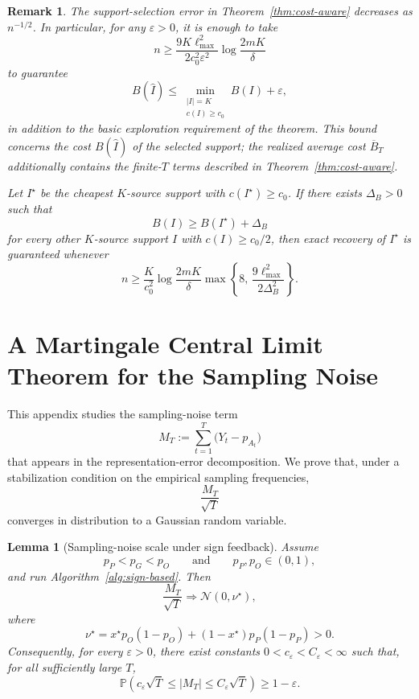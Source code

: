 \documentclass[twoside]{article}
\newtheorem{lemma}{Lemma}
\newtheorem{remark}{Remark}
\begin{document}
\begin{remark}
The support-selection error in Theorem~\ref{thm:cost-aware} decreases as
\(n^{-1/2}\).
In particular, for any \(\varepsilon>0\), it is enough to take
\[
n
\ge
\frac{9K\ell_{\max}^2}{2c_0^2\varepsilon^2}
\log\frac{2mK}{\delta}
\]
to guarantee
\[
B(\widehat I)
\le
\min_{\substack{|I|=K\\ c(I)\ge c_0}}
B(I)
+\varepsilon,
\]
in addition to the basic exploration requirement of the theorem.
This bound concerns the cost \(B(\widehat I)\) of the selected support;
the realized average cost \(\overline B_T\) additionally contains the
finite-\(T\) terms described in Theorem~\ref{thm:cost-aware}.

Let \(I^\star\) be the cheapest \(K\)-source support with
\(c(I^\star)\ge c_0\). If there exists \(\Delta_B>0\) such that
\[
B(I)\ge B(I^\star)+\Delta_B
\]
for every other \(K\)-source support \(I\) with
\(c(I)\ge c_0/2\), then exact recovery of \(I^\star\) is guaranteed whenever
\[
n
\ge
\frac{K}{c_0^2}
\log\frac{2mK}{\delta}
\max\left\{
8,\,
\frac{9\ell_{\max}^2}{2\Delta_B^2}
\right\}.
\]
\end{remark}

\section{A Martingale Central Limit Theorem for the Sampling Noise}
\label{app:martingale-clt}

This appendix studies the sampling-noise term
\[
M_T
:=
\sum_{t=1}^T
\bigl(Y_t-p_{A_t}\bigr)
\]
that appears in the representation-error decomposition. We prove that, under
a stabilization condition on the empirical sampling frequencies,
\[
\frac{M_T}{\sqrt{T}}
\]
converges in distribution to a Gaussian random variable.

\begin{lemma}[Sampling-noise scale under sign feedback]
\label{lem:sampling-noise-scale}
Assume
\[
p_P<p_G<p_O
\qquad\text{and}\qquad
p_P,p_O\in(0,1),
\]
and run Algorithm~\ref{alg:sign-based}. Then
\[
\frac{M_T}{\sqrt T}
\Longrightarrow
\mathcal N(0,\nu^\star),
\]
where
\[
\nu^\star
=
x^\star p_O(1-p_O)
+
(1-x^\star)p_P(1-p_P)
>0.
\]
Consequently, for every \(\varepsilon>0\), there exist constants
\(0<c_\varepsilon<C_\varepsilon<\infty\) such that, for all sufficiently
large \(T\),
\[
\mathbb P\left(
c_\varepsilon\sqrt T
\leq |M_T|
\leq C_\varepsilon\sqrt T
\right)
\geq 1-\varepsilon.
\]
\end{lemma}
\end{document}
